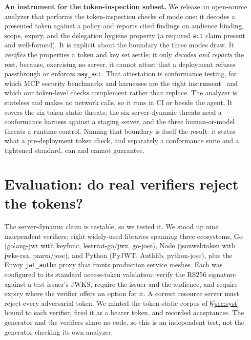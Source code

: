 \noindent\textbf{An instrument for the token-inspection subset.} We release an
open-source analyzer that performs the token-inspection checks of mode one: it decodes
a presented token against a policy and reports cited findings on audience binding,
scope, expiry, and the delegation hygiene property (a required \texttt{act} claim
present and well-formed). It is explicit about the boundary the three modes draw. It
\emph{verifies} the properties a token and key set settle; it only \emph{decodes and
reports} the rest, because, exercising no server, it cannot attest that a deployment
refuses passthrough or enforces \texttt{may\_act}. That attestation is conformance
testing, for which MCP security benchmarks and harnesses are the right
instrument~\cite{agentauth2025mcpsecbench,agentauth2025mcpxkit} and which our
token-level checks complement rather than replace. The analyzer is stateless and makes
no network calls, so it runs in CI or beside the agent. It covers the six token-static
threats; the six server-dynamic threats need a conformance harness against a staging
server, and the three human-or-model threats a runtime control. Naming that boundary
is itself the result: it states what a pre-deployment token check, and separately a
conformance suite and a tightened standard, can and cannot guarantee.

\section{Evaluation: do real verifiers reject the tokens?}\label{sec:eval}
The server-dynamic claim is testable, so we tested it. We stood up nine independent
verifiers: eight widely-used libraries spanning three ecosystems, Go (golang-jwt with
keyfunc, lestrrat-go/jwx, go-jose), Node (jsonwebtoken with jwks-rsa, panva/jose), and
Python (PyJWT, Authlib, python-jose), plus the Envoy \texttt{jwt\_authn} proxy that
fronts production service meshes. Each was configured to its standard access-token
validation: verify the RS256 signature against a test issuer's JWKS, require the issuer
and the audience, and require expiry where the verifier offers an option for it. A
correct resource server must reject every adversarial token. We minted the token-static
corpus of \S\ref{sec:syst} bound to each verifier, fired it as a bearer token, and
recorded acceptances. The generator and the verifiers share no code, so this is an
independent test, not the generator checking its own analyzer.

